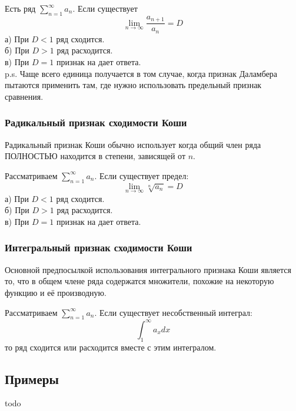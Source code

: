 \documentclass[12pt,a4paper]{article}
\begin{document}
Есть ряд $ \sum_{n=1}^{\infty} a_n $. Если существует
\[ \lim_{n \to \infty} \frac{a_{n+1}}{a_n}=D \]
а) При $ D<1 $ ряд сходится.\\
б) При $ D>1 $ ряд расходится.\\
в) При $ D=1 $ признак на дает ответа.\\
p.s. Чаще всего единица получается в том случае, когда признак Даламбера пытаются применить там, где нужно использовать предельный признак сравнения.
\subsubsection{Радикальный признак сходимости Коши}
Радикальный признак Коши обычно использует когда общий член ряда ПОЛНОСТЬЮ находится в степени, зависящей от $ n $.

Рассматриваем $ \sum_{n=1}^{\infty} a_n $. Если существует предел:
\[ \lim_{n \to \infty} \sqrt[n]{a_n}=D \]
а) При $ D<1 $ ряд сходится.\\
б) При $ D>1 $ ряд расходится.\\
в) При $ D=1 $ признак на дает ответа.\\
\subsubsection{Интегральный признак сходимости Коши}
Основной предпосылкой использования интегрального признака Коши является то, что в общем члене ряда содержатся множители, похожие на некоторую функцию и её производную.

Рассматриваем $ \sum_{n=1}^{\infty} a_n $. Если существует несобственный интеграл:
\[ \int_{1}^{\infty}a_xdx \]
то ряд сходится или расходится вместе с этим интегралом.
\subsection{Примеры}
todo
\end{document}
